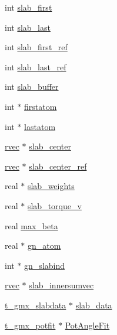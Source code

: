 \begin{DoxyCompactItemize}
\item 
int \hyperlink{structgmx__enfrotgrp_af601db8c9620b84a213ed078fd62f458}{slab\-\_\-first}
\item 
int \hyperlink{structgmx__enfrotgrp_ace79d07b2e1989538a20635c0115b079}{slab\-\_\-last}
\item 
int \hyperlink{structgmx__enfrotgrp_ada0b6f2eda75b5409bf02984e5a7eb82}{slab\-\_\-first\-\_\-ref}
\item 
int \hyperlink{structgmx__enfrotgrp_ac69a2f114b761f88f7c0a7c95d0d15b8}{slab\-\_\-last\-\_\-ref}
\item 
int \hyperlink{structgmx__enfrotgrp_a2f9f2ad719bbff25a4ba08c9556894ce}{slab\-\_\-buffer}
\item 
int $\ast$ \hyperlink{structgmx__enfrotgrp_a088a677acb7532806e4fdc7a19aabe2d}{firstatom}
\item 
int $\ast$ \hyperlink{structgmx__enfrotgrp_a84c50744a5c24de8dd192653286db86a}{lastatom}
\item 
\hyperlink{share_2template_2gromacs_2types_2simple_8h_aa02a552a4abd2f180c282a083dc3a999}{rvec} $\ast$ \hyperlink{structgmx__enfrotgrp_aba7a6a75832e49f2eb1756d477be4a11}{slab\-\_\-center}
\item 
\hyperlink{share_2template_2gromacs_2types_2simple_8h_aa02a552a4abd2f180c282a083dc3a999}{rvec} $\ast$ \hyperlink{structgmx__enfrotgrp_a15de9fe9a133d7a94fb3261f529013ce}{slab\-\_\-center\-\_\-ref}
\item 
real $\ast$ \hyperlink{structgmx__enfrotgrp_abd409d083ab015d1937646d4484595ec}{slab\-\_\-weights}
\item 
real $\ast$ \hyperlink{structgmx__enfrotgrp_ab8b5fecb5437a7cd21afb53f536e382f}{slab\-\_\-torque\-\_\-v}
\item 
real \hyperlink{structgmx__enfrotgrp_ac3907c78cd20eccc0e427c288bec058d}{max\-\_\-beta}
\item 
real $\ast$ \hyperlink{structgmx__enfrotgrp_a0a8865a648261d54419a944add471914}{gn\-\_\-atom}
\item 
int $\ast$ \hyperlink{structgmx__enfrotgrp_a5901283670f9a328b793012adc4cfda7}{gn\-\_\-slabind}
\item 
\hyperlink{share_2template_2gromacs_2types_2simple_8h_aa02a552a4abd2f180c282a083dc3a999}{rvec} $\ast$ \hyperlink{structgmx__enfrotgrp_aca7b055218091b728ee7f4cb2a67eac6}{slab\-\_\-innersumvec}
\item 
\hyperlink{pull__rotation_8c_abfd783f33af429c91c1cc95bf8a0a73e}{t\-\_\-gmx\-\_\-slabdata} $\ast$ \hyperlink{structgmx__enfrotgrp_af92de11ac4a090bb051b19d87109739f}{slab\-\_\-data}
\item 
\hyperlink{pull__rotation_8c_a0f3cd96f73250073834fb8295fab37f6}{t\-\_\-gmx\-\_\-potfit} $\ast$ \hyperlink{structgmx__enfrotgrp_ac8162e8f8ac5f7f9d5f35b78e13efcb1}{\-Pot\-Angle\-Fit}
\end{DoxyCompactItemize}


